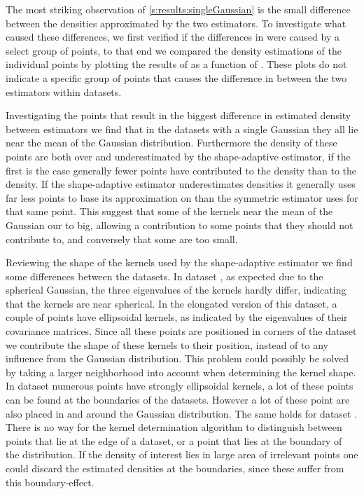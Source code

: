 
		The most striking observation of \cref{s:results:singleGaussian} is the small difference between the densities approximated by the two estimators. To investigate what caused these differences, we first verified if the differences in \mse were caused by a select group of points, to that end we compared the density estimations of the individual points by plotting the results of \sambe as a function of \mbe. These plots do not indicate a specific group of points that causes the difference in \MSE between the two estimators within datasets.
		
		Investigating the points that result in the biggest difference in estimated density between estimators we find that in the datasets with a single Gaussian they all lie near the mean of the Gaussian distribution. Furthermore the density of these points are both over and underestimated by the shape-adaptive estimator, if the first is the case generally fewer points have contributed to the \mbe density than to the \sambe density. If the shape-adaptive estimator underestimates densities it generally uses far less points to base its approximation on than the symmetric estimator uses for that same point. This suggest that some of the kernels near the mean of the Gaussian our to big, allowing a contribution to some points that they should not contribute to, and conversely that some are too small. 

		Reviewing the shape of the kernels used by the shape-adaptive estimator we find some differences between the datasets. 
			In dataset \ferdosiOne, as expected due to the spherical Gaussian, the three eigenvalues of the kernels hardly differ, indicating that the kernels are near spherical. 
			In the elongated version of this dataset, a couple of points have ellipsoidal kernels, as indicated by the eigenvalues of their covariance matrices. Since all these points are positioned in corners of the dataset we contribute the shape of these kernels to their position, instead of to any influence from the Gaussian distribution. This problem could possibly be solved by taking a larger neighborhood into account when determining the kernel shape. 
			In dataset \baakmanFour numerous points have strongly ellipsoidal kernels, a lot of these points can be found at the boundaries of the datasets. However a lot of these point are also placed in and around the Gaussian distribution. 
			The same holds for dataset \baakmanFive.
		There is no way for the kernel determination algorithm to distinguish between points that lie at the edge of a dataset, or a point that lies at the boundary of the distribution. If the density of interest lies in large area of irrelevant points one could discard the estimated densities at the boundaries, since these suffer from this boundary-effect.
			
